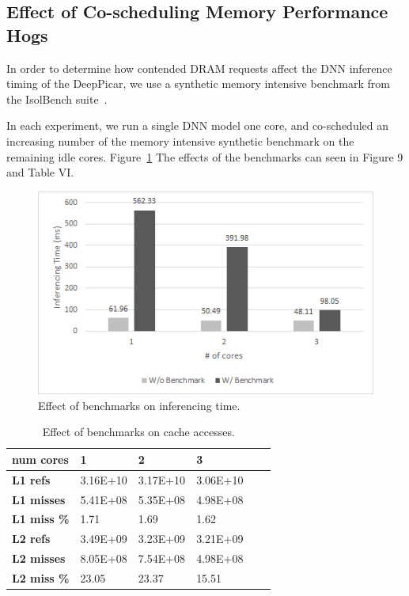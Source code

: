 
\subsection{Effect of Co-scheduling Memory Performance Hogs}

In order to determine how contended DRAM requests affect the DNN
inference timing of the DeepPicar, we use a synthetic memory
intensive benchmark from the IsolBench suite~\cite{Valsan2016}.

In each experiment, we run a single DNN model one core, and
co-scheduled an increasing number of the memory intensive synthetic
benchmark on the remaining idle cores.
Figure~\ref{fig:}
The effects of the benchmarks can seen in Figure 9 and Table VI. 

\begin{figure}[h]
  \centering
  \includegraphics[width=.5\textwidth]{figs/BenchmarkChart}
  \caption{Effect of benchmarks on inferencing time.}
  \label{fig:}
\end{figure}

\begin{table}[h]
\centering
  \begin{tabular} {| l | l | l | l | l | l |}
  \hline
  \textbf{num cores} & 1 & 2 & 3 \\ \hline
  \textbf{L1 refs} & 3.16E+10 & 3.17E+10 & 3.06E+10 \\ \hline
  \textbf{L1 misses} & 5.41E+08 & 5.35E+08 & 4.98E+08 \\ \hline
  \textbf{L1 miss \%} & 1.71 & 1.69 & 1.62 \\ \hline
  \textbf{L2 refs} & 3.49E+09 & 3.23E+09 & 3.21E+09 \\ \hline
  \textbf{L2 misses} & 8.05E+08 & 7.54E+08 & 4.98E+08 \\ \hline
  \textbf{L2 miss \%} & 23.05 & 23.37 & 15.51 \\ 
  \hline
  \end{tabular}
  \caption{ Effect of benchmarks on cache accesses. }
\end{table}


